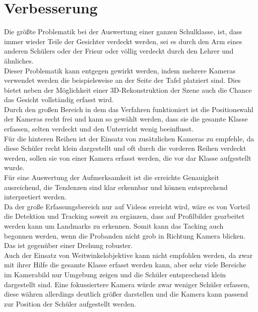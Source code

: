 \section{Verbesserung}
Die größte Problematik bei der Auswertung einer ganzen Schulklasse, ist, dass immer wieder Teile der Gesichter verdeckt werden, sei es durch den Arm eines anderen Schülers oder der Frisur oder völlig verdeckt durch den Lehrer und ähnliches.\\
Dieser Problematik kann entgegen gewirkt werden, indem mehrere Kameras verwendet werden die beispielsweise an der Seite der Tafel platziert sind. Dies bietet neben der Möglichkeit einer 3D-Rekonstruktion der Szene auch die Chance das Gesicht vollständig erfasst wird.\\
Durch den großen Bereich in dem das Verfahren funktioniert ist die Positionswahl der Kameras recht frei und kann so gewählt werden, dass sie die gesamte Klasse erfassen, selten verdeckt und den Unterricht wenig beeinflusst.\\
Für die hinteren Reihen ist der Einsatz von zusätzlichen Kameras zu empfehle, da diese Schüler recht klein dargestellt und oft durch die vorderen Reihen verdeckt werden, sollen sie von einer Kamera erfasst werden, die vor dar Klasse aufgestellt wurde.\\
Für eine Auswertung der Aufmerksamkeit ist die erreichte Genauigkeit ausreichend, die Tendenzen sind klar erkennbar und können entsprechend interpretiert werden.\\
Da der große Erfassungsbereich nur auf Videos erreicht wird, wäre es von Vorteil die Detektion und Tracking soweit zu ergänzen, dass auf Profilbilder gearbeitet werden kann um Landmarks zu erkennen. Somit kann das Tacking auch begonnen werden, wenn die Probanden nicht grob in Richtung Kamera blicken. Das ist gegenüber einer Drehung robuster.\\
Auch der Einsatz von Weitwinkelobjektive kann nicht empfohlen werden, da zwar mit ihrer Hilfe die gesamte Klasse erfasst werden kann, aber sehr viele Bereiche im Kamerabild nur Umgebung zeigen und die Schüler entsprechend klein dargestellt sind. Eine fokussiertere Kamera würde zwar weniger Schüler erfassen, diese währen allerdings deutlich größer darstellen und die Kamera kann passend zur Position der Schüler aufgestellt werden.